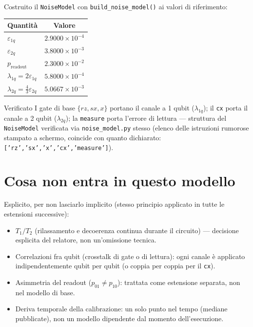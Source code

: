 \documentclass[11pt,a4paper]{article}
\begin{document}
Costruito il \texttt{NoiseModel} con \texttt{build\_noise\_model()} ai
valori di riferimento:

\begin{center}
\renewcommand{\arraystretch}{1.25}
\begin{tabular}{@{}lc@{}}
\toprule
\textbf{Quantità} & \textbf{Valore}\\
\midrule
$\varepsilon_{1q}$ & $2.9000\times10^{-4}$\\
$\varepsilon_{2q}$ & $3.8000\times10^{-3}$\\
$p_\text{readout}$ & $2.3000\times10^{-2}$\\
$\lambda_{1q}=2\varepsilon_{1q}$ & $5.8000\times10^{-4}$\\
$\lambda_{2q}=\frac{4}{3}\varepsilon_{2q}$ & $5.0667\times10^{-3}$\\
\bottomrule
\end{tabular}
\end{center}

\begin{okbox}{Verificato}
I gate di base $\{rz,sx,x\}$ portano il canale a 1 qubit ($\lambda_{1q}$);
il \texttt{cx} porta il canale a 2 qubit ($\lambda_{2q}$); la
\texttt{measure} porta l'errore di lettura --- struttura del
\texttt{NoiseModel} verificata via \texttt{noise\_model.py} stesso
(elenco delle istruzioni rumorose stampato a schermo, coincide con
quanto dichiarato: \texttt{['rz','sx','x','cx','measure']}).
\end{okbox}

\section{Cosa non entra in questo modello}

Esplicito, per non lasciarlo implicito (stesso principio applicato in
tutte le estensioni successive):
\begin{itemize}[leftmargin=1.3em,itemsep=0.2em]
\item $T_1/T_2$ (rilassamento e decoerenza continua durante il circuito)
--- decisione esplicita del relatore, non un'omissione tecnica.
\item Correlazioni fra qubit (crosstalk di gate o di lettura): ogni
canale è applicato indipendentemente qubit per qubit (o coppia per
coppia per il \texttt{cx}).
\item Asimmetria del readout ($p_{01}\neq p_{10}$): trattata come
estensione separata, non nel modello di base.
\item Deriva temporale della calibrazione: un solo punto nel tempo
(mediane pubblicate), non un modello dipendente dal momento
dell'esecuzione.
\end{itemize}
\end{document}
